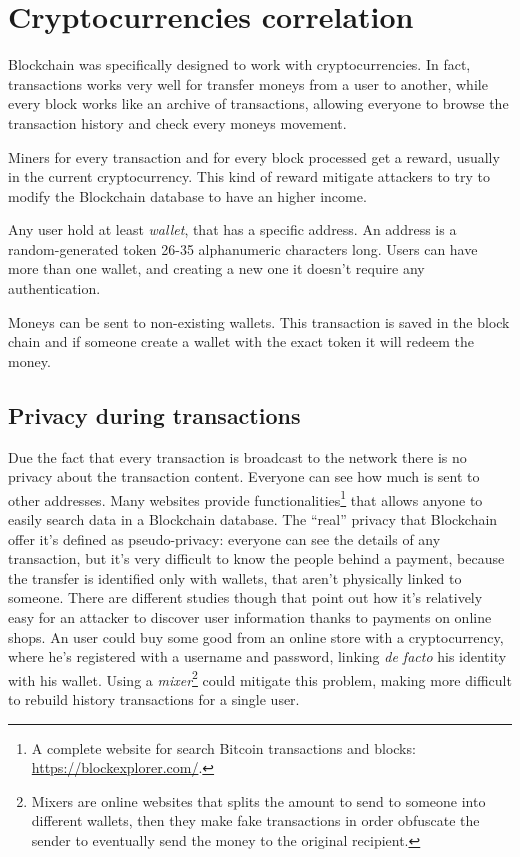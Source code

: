 \section{Cryptocurrencies correlation}

Blockchain was specifically designed to work with cryptocurrencies. In fact,
transactions works very well for transfer moneys from a user to another, while
every block works like an archive of transactions, allowing everyone to browse
the transaction history and check every moneys movement.

Miners for every transaction and for every block processed get a reward,
usually in the current cryptocurrency. This kind of reward mitigate attackers to
try to modify the Blockchain database to have an higher income.

Any user hold at least \textit{wallet}, that has a specific address. An
address is a random-generated token 26-35 alphanumeric characters long. Users
can have more than one wallet, and creating a new one it doesn't require any
authentication.

Moneys can be sent to non-existing wallets. This transaction is saved in the
block chain and if someone create a wallet with the exact token it will redeem
the money.

\subsection{Privacy during transactions}

Due the fact that every transaction is broadcast to the network there is no
privacy about the transaction content. Everyone can see how much is sent to
other addresses. Many websites provide functionalities\footnote{A complete
website for search Bitcoin transactions and blocks:
\url{https://blockexplorer.com/}.} that allows anyone to easily search data in a
Blockchain database. The ``real'' privacy that Blockchain offer it's defined as
pseudo-privacy: everyone can see the details of any transaction, but it's very
difficult to know the people behind a payment, because the transfer is
identified only with wallets, that aren't physically linked to someone. There
are different studies \cite{guadamuz15} though that point out how it's
relatively easy for an attacker to discover user information thanks to payments
on online shops. An user could buy some good from an online store with a
cryptocurrency, where he's registered with a username and password, linking
\textit{de facto} his identity with his wallet. Using a
\textit{mixer}\footnote{Mixers are online websites that splits the amount to
send to someone into different wallets, then they make fake transactions in
order obfuscate the sender to eventually send the money to the original
recipient.} could mitigate this problem, making more difficult to rebuild
history transactions for a single user.

